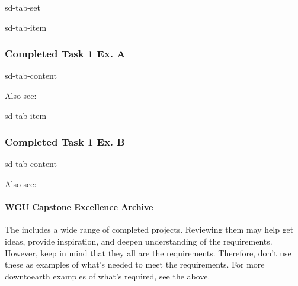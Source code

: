 \documentclass[letterpaper,10pt,english]{jupyterBook}
\begin{document}
\begin{sphinxuseclass}{sd-tab-set}
\begin{sphinxuseclass}{sd-tab-item}\subsubsection*{Completed Task 1 Ex. A}

\begin{sphinxuseclass}{sd-tab-content}\begin{quote}

\sphinxAtStartPar
{}
\end{quote}

\sphinxAtStartPar
Also see: {\hyperref[\detokenize{task2_doc/task2_doc:task2-doc-examples}]{}}

\end{sphinxuseclass}
\end{sphinxuseclass}
\begin{sphinxuseclass}{sd-tab-item}\subsubsection*{Completed Task 1 Ex. B}

\begin{sphinxuseclass}{sd-tab-content}\begin{quote}

\sphinxAtStartPar
{}
\end{quote}

\sphinxAtStartPar
Also see: 

\end{sphinxuseclass}
\end{sphinxuseclass}
\end{sphinxuseclass}

\paragraph{WGU Capstone Excellence Archive}
\label{\detokenize{task1:wgu-capstone-excellence-archive}}
\sphinxAtStartPar
The  includes a wide range of completed projects. Reviewing them may help get ideas, provide inspiration, and deepen understanding of the requirements. However, keep in mind that they all are  the requirements. Therefore, don’t use these as examples of what’s needed to meet the requirements. For more down\sphinxhyphen{}to\sphinxhyphen{}earth examples of what’s required, see the {\hyperref[\detokenize{task1:task1-examples-completed-examples}]{}} above.
\end{document}
